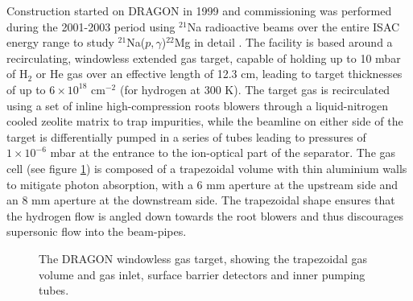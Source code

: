 Construction started on DRAGON in 1999 and commissioning was performed during the 2001-2003 period using $^{21}$Na radioactive beams over the entire ISAC energy range to study $^{21}$Na($p,\gamma$)$^{22}$Mg in detail \cite{dau04}. The facility is based around a recirculating, windowless extended gas target, capable of holding up to 10 mbar of H$_{2}$ or He gas over an effective length of 12.3 cm, leading to target thicknesses of up to $6 \times 10^{18}$ cm$^{-2}$ (for hydrogen at 300 K). The target gas is recirculated using a set of inline high-compression roots blowers through a liquid-nitrogen cooled zeolite matrix to trap impurities, while the beamline on either side of the target is differentially pumped in a series of tubes leading to pressures of ~$1\times 10^{-6}$ mbar at the entrance to the ion-optical part of the separator. The gas cell (see figure \ref{fig:dra_gas_target}) is composed of a trapezoidal volume with thin aluminium walls to mitigate photon absorption, with a 6 mm aperture at the upstream side and an 8 mm aperture at the downstream side. The trapezoidal shape ensures that the hydrogen flow is angled down towards the root blowers and thus discourages supersonic flow into the beam-pipes. 

\begin{figure}
\caption{The DRAGON windowless gas target, showing the trapezoidal gas volume and gas inlet, surface barrier detectors and inner pumping tubes.  }
\label{fig:dra_gas_target}
\end{figure}

